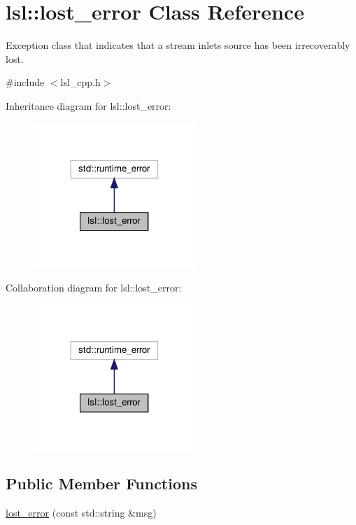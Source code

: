 \hypertarget{classlsl_1_1lost__error}{}\section{lsl\+:\+:lost\+\_\+error Class Reference}
\label{classlsl_1_1lost__error}


Exception class that indicates that a stream inlet\textquotesingle{}s source has been irrecoverably lost.  




{\ttfamily \#include $<$lsl\+\_\+cpp.\+h$>$}



Inheritance diagram for lsl\+:\+:lost\+\_\+error\+:
\nopagebreak
\begin{figure}[H]
\begin{center}
\leavevmode
\includegraphics[width=173pt]{d5/d0b/classlsl_1_1lost__error__inherit__graph}
\end{center}
\end{figure}


Collaboration diagram for lsl\+:\+:lost\+\_\+error\+:
\nopagebreak
\begin{figure}[H]
\begin{center}
\leavevmode
\includegraphics[width=173pt]{d7/d36/classlsl_1_1lost__error__coll__graph}
\end{center}
\end{figure}
\subsection*{Public Member Functions}
\begin{DoxyCompactItemize}
\item 
\hyperlink{classlsl_1_1lost__error_a997ff6ff1ecd4fd33cda631b975d386e}{lost\+\_\+error} (const std\+::string \&msg)
\end{DoxyCompactItemize}


